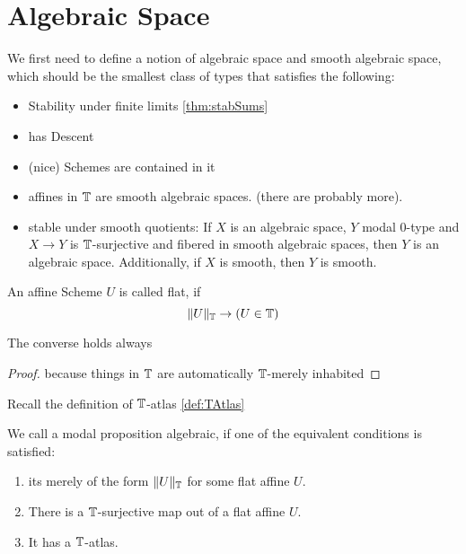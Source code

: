 \section{Algebraic Space}
We first need to define a notion of algebraic space and smooth algebraic space, which should be the smallest class of types that satisfies the following:
\begin{itemize}
	\item Stability under finite limits \ref{thm:stabSums} 
	\item has Descent
	\item (nice) Schemes are contained in it
	\item affines in $\mathbb{T}$ are smooth algebraic spaces.  (there are probably more). %
	\item stable under smooth quotients: If $X$ is an algebraic space, $Y$ modal 0-type and $X \to Y$ is $\mathbb{T}$-surjective and fibered in smooth algebraic spaces, then $Y$ is an algebraic space. Additionally, if $X$ is smooth, then $Y$ is smooth.
\end{itemize}
\begin{definition}
	An affine Scheme $U$ is called flat, if 
	\[\|U\|_{\mathbb{T}} \to (U \in \mathbb{T})\]	
\end{definition}
\begin{lemma}{\label{lemma:flatEquiv}}
	The converse holds always
\end{lemma}
\begin{proof}
	 because things in $\mathbb{T}$ are automatically $\mathbb{T}$-merely inhabited
\end{proof}
Recall the definition of $\mathbb{T}$-atlas \ref{def:TAtlas}
\begin{definition}{\label{def:algprop}}
	We call a modal proposition algebraic, if one of the equivalent conditions is satisfied:
	\begin{enumerate}
		\item  its merely of the form $\|U\|_{\mathbb{T}}$ for some flat affine $U$.
		\item There is a $\mathbb{T}$-surjective map out of a flat affine $U$.
		\item It has a $\mathbb{T}$-atlas.
	\end{enumerate}

\end{definition}
